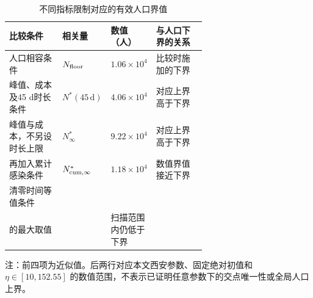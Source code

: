 \documentclass[lang=cn,a4paper,newtx]{elegantpaper}
\numberwithin{equation}{section}
\theoremstyle{plain}
\renewcommand{\arraystretch}{1.12}
\begin{document}
\begin{table}[htbp]
\centering\small
\setlength{\tabcolsep}{3.5pt}
\renewcommand{\arraystretch}{1.25}
\begin{threeparttable}
\caption{不同指标限制对应的有效人口界值}
\label{tab:dom:thresholds}
\begin{tabularx}{\linewidth}{@{}>{\raggedright\arraybackslash}p{0.27\linewidth}>{\centering\arraybackslash}p{0.21\linewidth}>{\centering\arraybackslash}p{0.16\linewidth}>{\raggedright\arraybackslash}X@{}}
\toprule
比较条件 & 相关量 & 数值（人） & 与人口下界的关系\\
\midrule
人口相容条件 & $N_{\rm floor}$ & $1.06\times10^4$ & 比较时施加的下界\\
峰值、成本及45 d时长条件 & $N^*(45\,\mathrm d)$ & $4.06\times10^4$ & 对应上界高于下界\\
峰值与成本，不另设时长上限 & $N^*_{\infty}$ & $9.22\times10^4$ & 对应上界高于下界\\
再加入累计感染条件 & $N^*_{\rm cum,\infty}$ & $1.18\times10^4$ & 数值界值接近下界\\
清零时间等值条件 & \makecell{$N_{\rm clr}(\eta)$\\的最大取值} & 5184 & 扫描范围内仍低于下界\\
\bottomrule
\end{tabularx}
\begin{tablenotes}[flushleft]\footnotesize
\item 注：前四项为近似值。后两行对应本文西安参数、固定绝对初值和 $\eta\in[10,152.55]$ 的数值范围，不表示已证明任意参数下的交点唯一性或全局人口上界。
\end{tablenotes}
\end{threeparttable}
\end{table}
\end{document}

